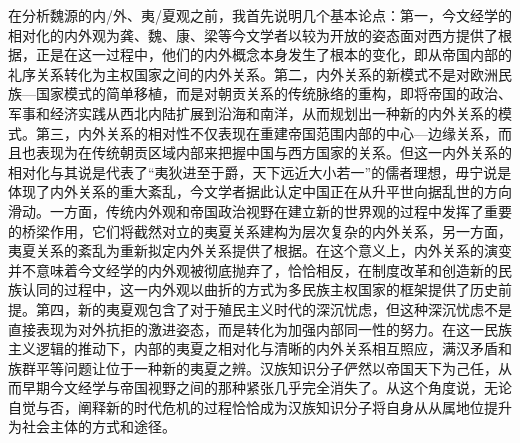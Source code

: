 \documentclass[a4paper, 12pt, openright]{ctexbook}
\begin{document}
在分析魏源的内/外、夷/夏观之前，我首先说明几个基本论点：第一，今文经学的相对化的内外观为龚、魏、康、梁等今文学者以较为开放的姿态面对西方提供了根据，正是在这一过程中，他们的内外概念本身发生了根本的变化，即从帝国内部的礼序关系转化为主权国家之间的内外关系。第二，内外关系的新模式不是对欧洲民族—国家模式的简单移植，而是对朝贡关系的传统脉络的重构，即将帝国的政治、军事和经济实践从西北内陆扩展到沿海和南洋，从而规划出一种新的内外关系的模式。第三，内外关系的相对性不仅表现在重建帝国范围内部的中心—边缘关系，而且也表现为在传统朝贡区域内部来把握中国与西方国家的关系。但这一内外关系的相对化与其说是代表了“夷狄进至于爵，天下远近大小若一”的儒者理想，毋宁说是体现了内外关系的重大紊乱，今文学者据此认定中国正在从升平世向据乱世的方向滑动。一方面，传统内外观和帝国政治视野在建立新的世界观的过程中发挥了重要的桥梁作用，它们将截然对立的夷夏关系建构为层次复杂的内外关系，另一方面，夷夏关系的紊乱为重新拟定内外关系提供了根据。在这个意义上，内外关系的演变并不意味着今文经学的内外观被彻底抛弃了，恰恰相反，在制度改革和创造新的民族认同的过程中，这一内外观以曲折的方式为多民族主权国家的框架提供了历史前提。第四，新的夷夏观包含了对于殖民主义时代的深沉忧虑，但这种深沉忧虑不是直接表现为对外抗拒的激进姿态，而是转化为加强内部同一性的努力。在这一民族主义逻辑的推动下，内部的夷夏之相对化与清晰的内外关系相互照应，满汉矛盾和族群平等问题让位于一种新的夷夏之辨。汉族知识分子俨然以帝国天下为己任，从而早期今文经学与帝国视野之间的那种紧张几乎完全消失了。从这个角度说，无论自觉与否，阐释新的时代危机的过程恰恰成为汉族知识分子将自身从从属地位提升为社会主体的方式和途径。
\end{document}
